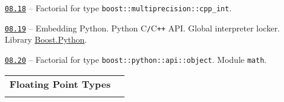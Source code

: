 \documentclass[a4paper,12pt]{article}
\renewenvironment{itemize}
{
    \begin{list}{\labelitemi}
    {
      \setlength{\topsep}{0pt}
      \setlength{\partopsep}{0pt}
      \setlength{\parskip}{0pt}
      \setlength{\itemsep}{0pt}
      \setlength{\parsep}{0pt}
      \setlength{\leftmargin}{14.5pt}
    }
}{\end{list}}
\begin{document}
\begin{itemize}
    \smallskip

    \item \href{https://github.com/i-s-m-mipt/Education/blob/master/projects/examples/source/08.18.cpp}{\texttt{08.18}} -- Factorial for type \lstinline{boost::multiprecision::cpp_int}.

    \smallskip

    \item \href{https://github.com/i-s-m-mipt/Education/blob/master/projects/examples/source/08.19.hpp}{\texttt{08.19}} -- Embedding Python. Python C\texttt{/}C\texttt{++} API. Global interpreter locker. Library \href{https://www.boost.org/doc/libs/1_84_0/libs/python/doc/html/index.html}{Boost.Python}. 

    \smallskip

    \item \href{https://github.com/i-s-m-mipt/Education/blob/master/projects/examples/source/08.20.cpp}{\texttt{08.20}} -- Factorial for type \lstinline{boost::python::api::object}. Module \lstinline{math}.

\end{itemize}

\bigskip\medskip

\begin{tabular}{!{\vrule width 1pt}L{4.1cm}!{\vrule width 1pt}L{14.9cm}!{\vrule width 0pt}} 


\textbf{Floating Point Types} & \\


\end{tabular}

\medskip\smallskip
\end{document}
